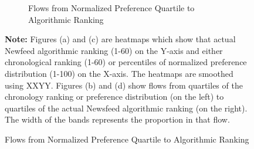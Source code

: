 \documentclass[12pt,letterpaper]{article}
\begin{document}
\begin{figure}[ht]
\begin{subfigure}{.5\textwidth}
        \caption{Flows from Normalized Preference Quartile to Algorithmic Ranking}
        \label{fig:nfpref_s}
    \end{subfigure}

\footnotesize \textbf{Note:} Figures (a) and (c) are heatmaps which show that actual Newfeed algorithmic ranking (1-60) on the Y-axis and either chronological ranking (1-60)  or percentiles of normalized preference distribution (1-100) on the X-axis. The heatmaps are smoothed using XXYY. Figures (b) and (d) show flows from quartiles of the chronology ranking or preference distribution (on the left) to quartiles of the actual Newsfeed algorithmic ranking (on the right). The width of the bands represents the proportion in that flow.
\end{figure}
\end{document}
